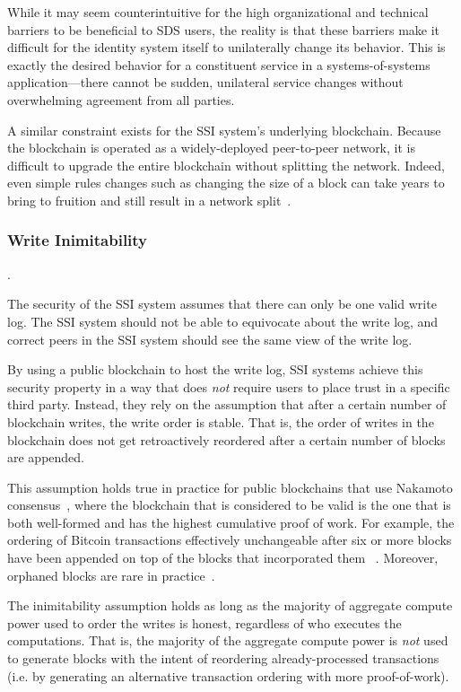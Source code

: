 While it may seem counterintuitive for the high organizational and technical
barriers to be beneficial to SDS users, the reality is that these barriers
make it difficult for the identity system itself to unilaterally change its
behavior.  This is exactly the desired behavior for a constituent service in a
systems-of-systems application---there cannot be sudden,
unilateral service changes without overwhelming agreement from all parties.

A similar constraint exists for the SSI system's underlying blockchain.
Because the blockchain is operated as a widely-deployed peer-to-peer network,
it is difficult to upgrade the entire blockchain without splitting the network.
Indeed, even simple rules changes such as changing the size of a block can take 
years to bring to fruition and still result in a network
split~\cite{bitcoin-cash-split}.

\subsubsection{Write Inimitability}.

The security of the SSI system assumes that there can only be one valid write
log.  The SSI system should not be able to equivocate about the write log, and
correct peers in the SSI system should see the same view of the write log.

By using a public blockchain to host the write log, SSI systems achieve
this security property in a way that does \emph{not} require users to place
trust in a specific third party.  Instead, they rely on the assumption that after a certain number
of blockchain writes, the write order is stable.  That is, the order of writes
in the blockchain does not get retroactively reordered after a certain number of
blocks are appended.

This assumption holds true in practice for public blockchains that use
Nakamoto consensus~\cite{nakamoto-consensus}, where the blockchain that is
considered to be valid is the one that is both well-formed and has the highest
cumulative proof of work.  For example, the ordering of Bitcoin transactions
effectively unchangeable after six or more blocks have been appended on top of
the blocks that incorporated them
~\cite{bitcoin-six-confirmations}.  Moreover, orphaned blocks are rare in
practice~\cite{blockchain-info-orphan-rate}.

The inimitability assumption holds as long as the
majority of aggregate compute power used to order the writes is honest,
regardless of who executes the computations.  That is, the majority of the
aggregate compute power is \emph{not} used to generate blocks with the intent of
reordering already-processed transactions (i.e. by generating an alternative
transaction ordering with more proof-of-work).


